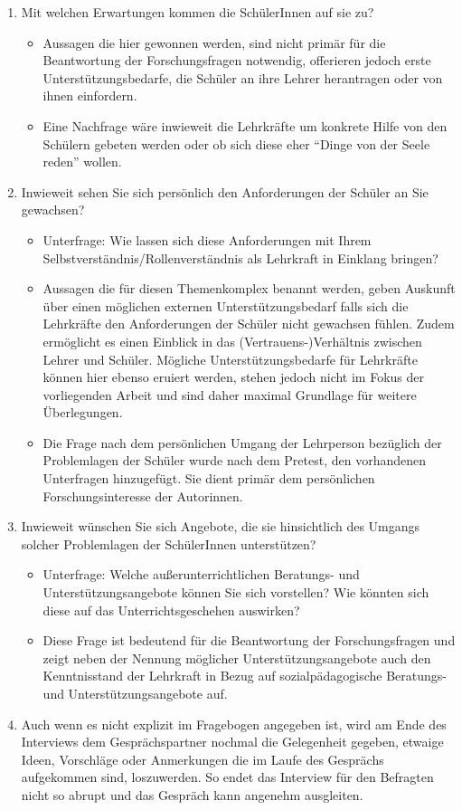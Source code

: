 \begin{enumerate}
\begin{itemize}
	\end{itemize}
	\item Mit welchen Erwartungen kommen die SchülerInnen auf sie zu?
	\begin{itemize}
		\item Aussagen die hier gewonnen werden, sind nicht primär für die Beantwortung der Forschungsfragen notwendig, offerieren jedoch erste Unterstützungsbedarfe, die Schüler an ihre Lehrer herantragen oder von ihnen einfordern.
		\item Eine Nachfrage wäre inwieweit die Lehrkräfte um konkrete Hilfe von den Schülern gebeten werden oder ob sich diese eher "`Dinge von der Seele reden"' wollen.
	\end{itemize}
	\item Inwieweit sehen Sie sich persönlich den Anforderungen der Schüler an Sie gewachsen? 
	\begin{itemize}
		\item Unterfrage: Wie lassen sich diese Anforderungen mit Ihrem Selbstverständnis/Rollenverständnis als Lehrkraft in Einklang bringen?
		\item Aussagen die für diesen Themenkomplex benannt werden, geben Auskunft über einen möglichen externen Unterstützungsbedarf falls sich die Lehrkräfte den Anforderungen der Schüler nicht gewachsen fühlen. Zudem ermöglicht es einen Einblick in das (Vertrauens-)Verhältnis zwischen Lehrer und Schüler. Mögliche Unterstützungsbedarfe für Lehrkräfte können hier ebenso eruiert werden, stehen jedoch nicht im Fokus der vorliegenden Arbeit und sind daher maximal Grundlage für weitere Überlegungen.
		\item Die Frage nach dem persönlichen Umgang der Lehrperson bezüglich der Problemlagen der Schüler wurde nach dem Pretest, den vorhandenen Unterfragen hinzugefügt. Sie dient primär dem persönlichen Forschungsinteresse der Autorinnen.
	\end{itemize}
	\item Inwieweit wünschen Sie sich Angebote, die sie hinsichtlich des Umgangs solcher Problemlagen der SchülerInnen unterstützen?
	\begin{itemize}
		\item Unterfrage: Welche außerunterrichtlichen Beratungs- und Unterstützungsangebote können Sie sich vorstellen? Wie könnten sich diese auf das Unterrichtsgeschehen auswirken?
		\item Diese Frage ist bedeutend für die Beantwortung der Forschungsfragen und zeigt neben der Nennung möglicher Unterstützungsangebote auch den Kenntnisstand der Lehrkraft in Bezug auf sozialpädagogische Beratungs- und Unterstützungsangebote auf.
		\end{itemize}
	\item Auch wenn es nicht explizit im Fragebogen angegeben ist, wird am Ende des Interviews dem Gesprächspartner nochmal die Gelegenheit gegeben, etwaige Ideen, Vorschläge oder Anmerkungen die im Laufe des Gesprächs aufgekommen sind, loszuwerden. So endet das Interview für den Befragten nicht so abrupt und das Gespräch kann angenehm ausgleiten.
\end{enumerate}

